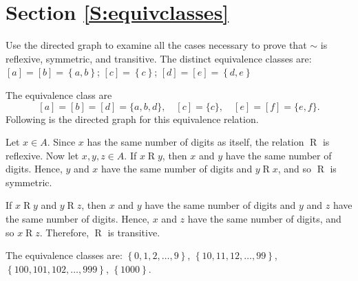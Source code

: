 \section*{Section \ref{S:equivclasses}}

\begin{list}{\bf{\ref{exer:sec73-1}.}}
\item Use the directed graph to examine all the cases necessary to prove that $\sim$ is reflexive, symmetric, and transitive.  The distinct equivalence classes are: $\left[ a \right] = \left[ b \right] = \left\{ a,b \right\}$; \quad 
$\left[ c \right] = \left\{ c \right\}$; \quad
$\left[ d \right] = \left[ e \right] = \left\{ d,e \right\}$
\end{list}


\begin{list}{\bf{\ref{exer:drawdirgraph}.}}
\item The equivalence class are
\[
[a] = [b] = [d] = \{a, b, d \}, \quad [c] = \{ c \}, \quad [e] = [f] = \{ e, f \}.
\]
Following is the directed graph for this equivalence relation.
\begin{figure}[!h]
\begin{center}
\end{center}
\end{figure}
\end{list}


\begin{list}{\bf{\ref{exer:sec73-2}.}}
\item Let $x \in A$.  Since $x$ has the same number of digits as itself, the relation $\mathrel{R}$ is reflexive.  Now let $x, y, z \in A$.  If $x \mathrel{R} y$, then $x$  and  $y$  have the same number of digits.  Hence, $y$ and $x$ have the same number of digits and $y \mathrel{R} x$, and so $\mathrel{R}$ is symmetric.

If $x \mathrel{R} y$ and $y \mathrel{R} z$, then $x$  and  $y$  have the same number of digits and 
$y$  and  $z$  have the same number of digits.  Hence, $x$  and  $z$  have the same number of digits, and so $x \mathrel{R} z$.  Therefore, $\mathrel{R}$ is transitive.

The equivalence classes are:  
$\left\{ 0, 1, 2, \ldots , 9 \right\}$, $\left\{ 10, 11, 12, \ldots , 99 \right\}$, \\
$\left\{ 100, 101, 102, \ldots , 999 \right\}$, $\left\{ 1000 \right\}$.
\end{list}



